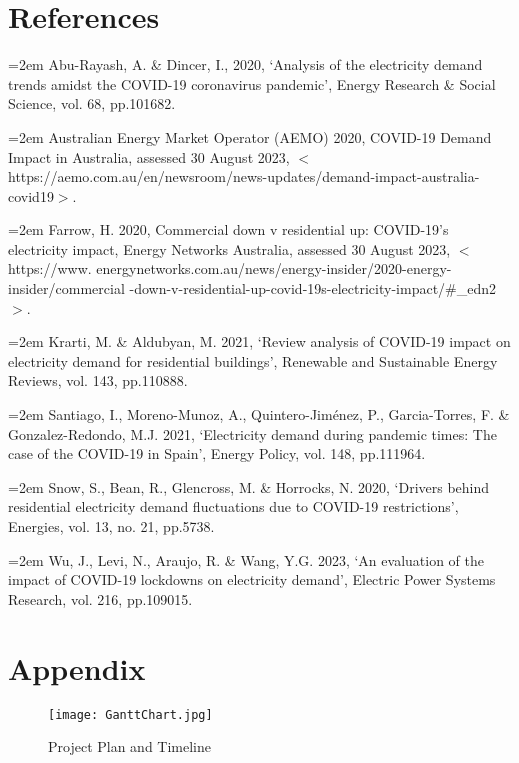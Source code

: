 \documentclass[mstat,12pt]{unswthesis}
\begin{document}
	
\bigskip

\hypertarget{references}{%
\chapter*{References}\label{references}}




\hypertarget{refs}{}

\leavevmode{}%
\hangindent=2em
Abu-Rayash, A. \& Dincer, I., 2020, ‘Analysis of the electricity demand trends amidst the COVID-19 coronavirus pandemic’, Energy Research \& Social Science, vol. 68, pp.101682. \hfill\break

\hangindent=2em
\noindent Australian Energy Market Operator (AEMO) 2020, COVID-19 Demand Impact in Australia, assessed 30 August 2023, $<$https://aemo.com.au/en/newsroom/news-updates/demand-impact-australia-covid19$>$. \hfill\break

\hangindent=2em
\noindent Farrow, H. 2020, Commercial down v residential up: COVID-19’s electricity impact, Energy Networks Australia, assessed 30 August 2023, $<$https://www. energynetworks.com.au/news/energy-insider/2020-energy-insider/commercial -down-v-residential-up-covid-19s-electricity-impact/\#\_edn2$>$. \hfill\break

\hangindent=2em
\noindent Krarti, M. \& Aldubyan, M. 2021, ‘Review analysis of COVID-19 impact on electricity demand for residential buildings’, Renewable and Sustainable Energy Reviews, vol. 143, pp.110888. \hfill\break

\hangindent=2em
\noindent Santiago, I., Moreno-Munoz, A., Quintero-Jiménez, P., Garcia-Torres, F. \& Gonzalez-Redondo, M.J. 2021, ‘Electricity demand during pandemic times: The case of the COVID-19 in Spain’, Energy Policy, vol. 148, pp.111964. \hfill\break

\hangindent=2em
\noindent Snow, S., Bean, R., Glencross, M. \& Horrocks, N. 2020, ‘Drivers behind residential electricity demand fluctuations due to COVID-19 restrictions’, Energies, vol. 13, no. 21, pp.5738. \hfill\break

\hangindent=2em
\noindent Wu, J., Levi, N., Araujo, R. \& Wang, Y.G. 2023, ‘An evaluation of the impact of COVID-19 lockdowns on electricity demand’, Electric Power Systems Research, vol. 216, pp.109015. \hfill\break

\bigskip

\hypertarget{appendix}{%
\chapter*{Appendix}\label{appendix}}

	\begin{figure}[htbp]%
		\centering
		
		\texttt{[image: GanttChart.jpg]} 
		\caption{Project Plan and Timeline}
	\end{figure}%
\end{document}
